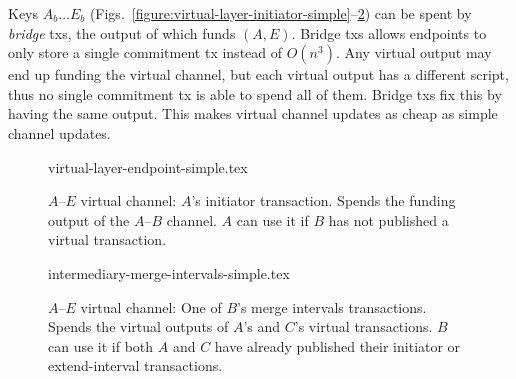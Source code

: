   Keys $A_b \dots E_b$
  (Figs.~\ref{figure:virtual-layer-initiator-simple}--\ref{figure:virtual-layer-merge-intervals-simple}) can be
  spent by \emph{bridge} txs, the output of which funds $(A, E)$.
  Bridge txs allows endpoints to only store a single commitment tx instead of $O(n^3)$.
  Any virtual output may end up funding the virtual channel, but each
  virtual output has a different script, thus no single
  commitment tx is able to spend all of them. Bridge txs fix this by having the
  same output. This makes virtual channel updates as cheap as simple channel
  updates.

%
  \begin{figure}[!htbp]
%
    {virtual-layer-endpoint-simple.tex}
    \caption{$A$--$E$ virtual channel: $A$'s initiator transaction. Spends the
    funding output of the $A$--$B$ channel. $A$ can use it if $B$ has not published
    a virtual transaction.}
    \label{figure:virtual-layer-endpoint-simple}
  \end{figure}
%
%
  \begin{figure}
%
    {intermediary-merge-intervals-simple.tex}
    \caption{$A$--$E$ virtual channel: One of $B$'s merge intervals
    transactions. Spends the virtual outputs of $A$'s and $C$'s virtual
    transactions. $B$ can use it if both $A$ and $C$ have already published
    their initiator or extend-interval transactions.}
    \label{figure:virtual-layer-merge-intervals-simple}
  \end{figure}
%


